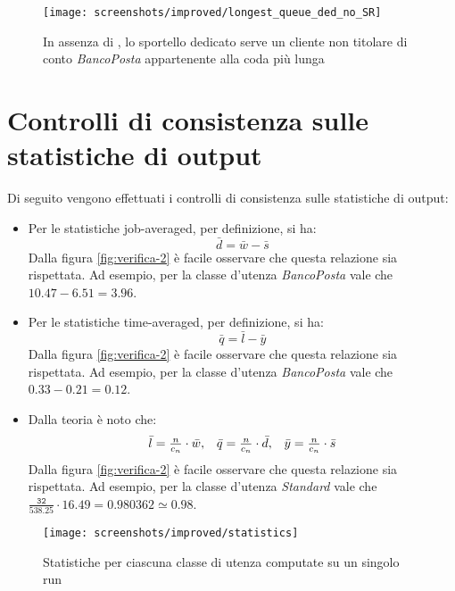\captionsetup[figure]{justification=centering}
\begin{figure}[ht]
\centering
\texttt{[image: screenshots/improved/longest\_queue\_ded\_no\_SR]}
\caption{In assenza di \sr{}, lo sportello dedicato serve un cliente non titolare di conto \textsl{BancoPosta} appartenente alla coda più lunga}   
\label{fig:miglioria-verifica-2}
\end{figure}

\section{Controlli di consistenza sulle statistiche di output}
Di seguito vengono effettuati i controlli di consistenza sulle statistiche di output:
\begin{itemize}
\item Per le statistiche job-averaged, per definizione, si ha:
\begin{equation}
\bar{d} = \bar{w} - \bar{s}
\end{equation}
Dalla figura \ref{fig:verifica-2} è facile osservare che questa relazione sia rispettata. Ad esempio, per la classe d'utenza \uo{} \textsl{BancoPosta} vale che $\mathtt{10.47 - 6.51 = 3.96}$.
\item Per le statistiche time-averaged, per definizione, si ha:
\begin{equation}
\bar{q} = \bar{l} - \bar{y}
\end{equation}
Dalla figura \ref{fig:verifica-2} è facile osservare che questa relazione sia rispettata. Ad esempio, per la classe d'utenza \uo{} \textsl{BancoPosta} vale che $\mathtt{0.33 - 0.21 = 0.12}$.
\item Dalla teoria è noto che:
\begin{equation}
\begin{array}{c c c}
\bar{l} = \frac{n}{c_n} \cdot \bar{w}, & \bar{q} = \frac{n}{c_n} \cdot \bar{d}, & \bar{y} = \frac{n}{c_n} \cdot \bar{s} 
\end{array}
\end{equation}
Dalla figura \ref{fig:verifica-2} è facile osservare che questa relazione sia rispettata. Ad esempio, per la classe d'utenza \pp{} \textsl{Standard} vale che $\mathtt{\frac{32}{538.25} \cdot 16.49 = 0.980362 \simeq 0.98}$.
\end{itemize}

\begin{figure}[ht]  
\centering 
\texttt{[image: screenshots/improved/statistics]}
\caption{Statistiche per ciascuna classe di utenza computate su un singolo run}   
\label{fig:miglioria-verifica-3}
\end{figure}

